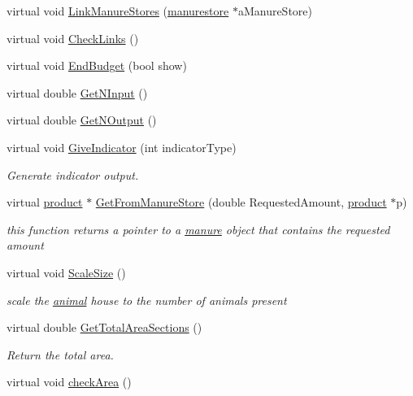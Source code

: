 \begin{DoxyCompactItemize}
virtual void \hyperlink{classstable_a55ffbd42077f05d0db4c4f7d15ac727a}{LinkManureStores} (\hyperlink{classmanurestore}{manurestore} $\ast$aManureStore)
\item 
virtual void \hyperlink{classstable_ab5d66f0a84fb3e73971682da583206e8}{CheckLinks} ()
\item 
virtual void \hyperlink{classstable_ab9f96c65f6dc2d3cf6b1788434505857}{EndBudget} (bool show)
\item 
virtual double \hyperlink{classstable_a3361fcda27cc06bc63567e7afdd5270c}{GetNInput} ()
\item 
virtual double \hyperlink{classstable_ae0081d6197b922c43e3c36780705e42f}{GetNOutput} ()
\item 
virtual void \hyperlink{classstable_a2911ffc8041366d46674bf48a6b4d6c5}{GiveIndicator} (int indicatorType)
\begin{DoxyCompactList}\small\item\em Generate indicator output. \item\end{DoxyCompactList}\item 
virtual \hyperlink{classproduct}{product} $\ast$ \hyperlink{classstable_a3de6b97449e7f4a58ffad4690d81831a}{GetFromManureStore} (double RequestedAmount, \hyperlink{classproduct}{product} $\ast$p)
\begin{DoxyCompactList}\small\item\em this function returns a pointer to a \hyperlink{classmanure}{manure} object that contains the requested amount \item\end{DoxyCompactList}\item 
virtual void \hyperlink{classstable_af4e0be5221f1bddebfe9297188e00089}{ScaleSize} ()
\begin{DoxyCompactList}\small\item\em scale the \hyperlink{classanimal}{animal} house to the number of animals present \item\end{DoxyCompactList}\item 
virtual double \hyperlink{classstable_a8b0725c4f70fea2c3cb3c107bf8ed4f3}{GetTotalAreaSections} ()
\begin{DoxyCompactList}\small\item\em Return the total area. \item\end{DoxyCompactList}\item 
virtual void \hyperlink{classstable_abf86381ef397c270b3eeb9909dc06a23}{checkArea} ()

\end{DoxyCompactItemize}
